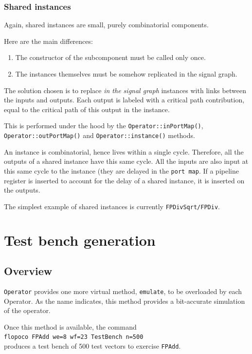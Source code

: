 \documentclass{article}
\begin{document}
\subsubsection{Shared instances}

Again, shared instances are small, purely combinatorial components.

Here are the main differences:
\begin{enumerate}
\item The constructor of the subcomponent must be called only once.
\item The instances themselves must be somehow replicated in the signal graph.
\end{enumerate}
The solution chosen is to replace \emph{in the signal graph} instances with links between the inputs and outputs.
Each output is labeled with a critical path contribution,   equal to the critical path of this output in the instance.

This is performed under the hood by the \verb!Operator::inPortMap()!, \verb!Operator::outPortMap()! and \verb!Operator::instance()! methods.

An instance is combinatorial, hence lives within a single cycle.
Therefore, all the outputs of a shared instance have this same cycle.
All the inputs are also input at this same cycle to the instance (they are delayed in the \texttt{port map}.
If a pipeline register is inserted to account for the delay of a shared instance, it is inserted on the outputs.

The simplest example of shared instances is currently \texttt{FPDivSqrt/FPDiv}.


\section{Test bench generation}\label{sec:test-bench-gener}

\subsection{Overview}
\texttt{\small Operator} provides one more virtual method, \texttt{\small emulate},
to be overloaded by each Operator. As the name indicates, this method
provides a bit-accurate simulation of the operator.
 
Once this method is available, the command\\
 \texttt{flopoco FPAdd we=8 wf=23 TestBench n=500} \\
produces a test bench of 500 test vectors to exercise \texttt{\small FPAdd}. 
\end{document}
